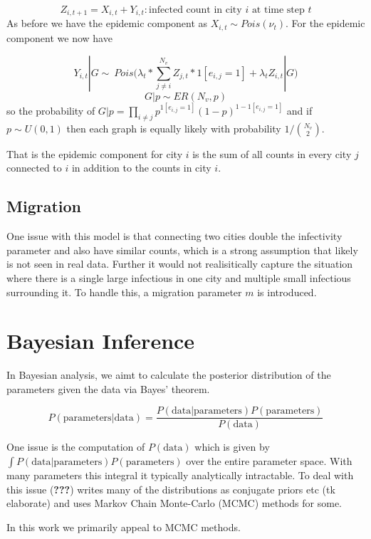 \documentclass[]{article}
\numberwithin{equation}{section}
\begin{document}
\[Z_{i,t+1} = X_{i,t} + Y_{i,t}: \text{infected count in city } i \text{ at time step } t \]
As before we have the epidemic component as
\(X_{i,t} \sim Pois(\nu_t)\). For the epidemic component we now have

\[Y_{i,t}|G \sim ~ Pois\big(\lambda_t*\sum_{j\neq i}^{N_v}Z_{j,t}*1[e_{i,j}=1]+ \lambda_tZ_{i,t} | G\big) \]
\[G|p \sim ER(N_v, p)\] so the probability of
\(G|p = \prod_{i \neq j} p^{1[e_{i,j}=1]}(1-p)^{1-1[e_{i,j}=1]}\) and if
\(p\sim U(0,1)\) then each graph is equally likely with probability
\(1/\binom{N_v}{2}\).

That is the epidemic component for city \(i\) is the sum of all counts
in every city \(j\) connected to \(i\) in addition to the counts in city
\(i\).

\hypertarget{migration}{%
\subsection{Migration}\label{migration}}

One issue with this model is that connecting two cities double the
infectivity parameter and also have similar counts, which is a strong
assumption that likely is not seen in real data. Further it would not
realisitically capture the situation where there is a single large
infectious in one city and multiple small infectious surrounding it. To
handle this, a migration parameter \(m\) is introduced.

\hypertarget{bayesian-inference}{%
\section{Bayesian Inference}\label{bayesian-inference}}

In Bayesian analysis, we aimt to calculate the posterior distribution of
the parameters given the data via Bayes' theorem.

\[ P(\text{parameters}|\text{data}) = \frac{P(\text{data}|\text{parameters})P(\text{parameters})}{P(\text{data})} \]

One issue is the computation of \(P(\text{data})\) which is given by
\(\int P(\text{data}|\text{parameters})P(\text{parameters})\) over the
entire parameter space. With many parameters this integral it typically
analytically intractable. To deal with this issue ({\textbf{???}})
writes many of the distributions as conjugate priors etc (tk elaborate)
and uses Markov Chain Monte-Carlo (MCMC) methods for some.

In this work we primarily appeal to MCMC methods.
\end{document}
